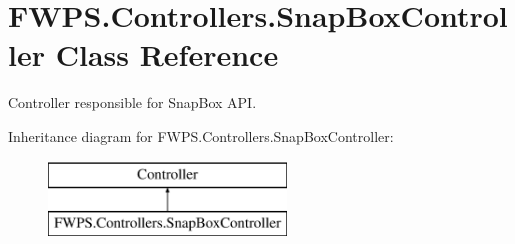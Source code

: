 \hypertarget{class_f_w_p_s_1_1_controllers_1_1_snap_box_controller}{}\section{F\+W\+P\+S.\+Controllers.\+Snap\+Box\+Controller Class Reference}
\label{class_f_w_p_s_1_1_controllers_1_1_snap_box_controller}


Controller responsible for Snap\+Box A\+PI.  


Inheritance diagram for F\+W\+P\+S.\+Controllers.\+Snap\+Box\+Controller\+:\begin{figure}[H]
\begin{center}
\leavevmode
\includegraphics[height=2.000000cm]{class_f_w_p_s_1_1_controllers_1_1_snap_box_controller}
\end{center}
\end{figure}
